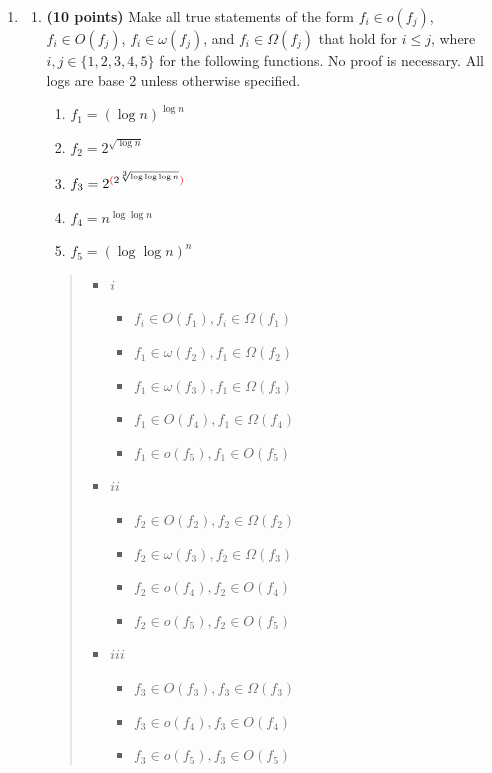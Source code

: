 \documentclass[11pt]{article}
\begin{document}
\begin{enumerate}[leftmargin=*]
\item
\begin{enumerate}
\item
{\bf (10 points)}
Make all true statements of the form $f_i \in o(f_j)$, $f_i \in O(f_j)$, $f_i \in \omega(f_j)$, and $f_i \in \Omega(f_j)$ that hold for $i \le j$, where $i, j \in \{1,2,3,4,5\}$ for the following functions. No proof is necessary. All logs are base 2 unless otherwise specified.
\begin{enumerate}
\item $f_1 = (\log n)^{\log n}$
\item $f_2 = 2^{\sqrt{\log n}}$
\item $f_3 = 2^{{\color{red}(}2^{\sqrt[3]{\log\log\log n}}{\color{red})}}$
\item $f_4 = n^{\log\log n}$
\item $f_5 = (\log\log n)^n$
\end{enumerate}
\begin{quote}
  \color{purple}
  \begin{itemize}
    \item $i$
    \begin{itemize}
      \item $f_i \in O(f_1), f_i \in \Omega(f_1)$ 
      \item $f_1 \in \omega(f_2), f_1 \in \Omega(f_2)$ 
      \item $f_1 \in \omega(f_3), f_1 \in \Omega(f_3)$ 
      \item $f_1 \in O(f_4), f_1 \in \Omega(f_4)$ 
      \item $f_1 \in o(f_5), f_1 \in O(f_5)$ 
    \end{itemize}
    \item $ii$
    \begin{itemize}
      \item $f_2 \in O(f_2), f_2 \in \Omega(f_2)$ 
      \item $f_2 \in \omega(f_3), f_2 \in \Omega(f_3)$ 
      \item $f_2 \in o(f_4), f_2 \in O(f_4)$ 
      \item $f_2 \in o(f_5), f_2 \in O(f_5)$ 
    \end{itemize}
    \item $iii$
    \begin{itemize}
      \item $f_3 \in O(f_3), f_3 \in \Omega(f_3)$ 
      \item $f_3 \in o(f_4), f_3 \in O(f_4)$ 
      \item $f_3 \in o(f_5), f_3 \in O(f_5)$ 

\end{itemize}
\end{itemize}
\end{quote}
\end{enumerate}
\end{enumerate}
\end{document}
